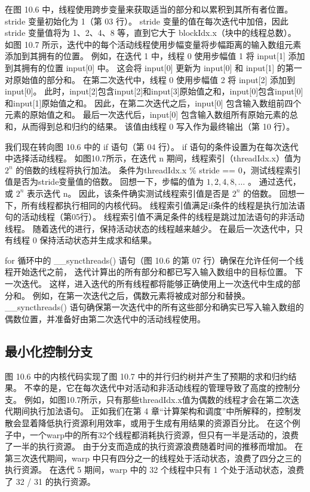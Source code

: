 在图 10.6 中，线程使用跨步变量来获取适当的部分和以累积到其所有者位置。 stride 变量初始化为 1（第 03 行）。 
stride 变量的值在每次迭代中加倍，因此 stride 变量值将为 1、2、4、8 等，直到它大于 blockIdx.x（块中的线程总数）。 
如图 10.7 所示，迭代中的每个活动线程使用步幅变量将步幅距离的输入数组元素添加到其拥有的位置。 
例如，在迭代 1 中，线程 0 使用步幅值 1 将 input[1] 添加到其拥有的位置 input[0] 中。 
这会将 input[0] 更新为 input[0] 和 input[1] 的第一对原始值的部分和。 
在第二次迭代中，线程 0 使用步幅值 2 将 input[2] 添加到 input[0]。 
此时，input[2]包含input[2]和input[3]原始值之和，input[0]包含input[0]和input[1]原始值之和。 
因此，在第二次迭代之后，input[0] 包含输入数组前四个元素的原始值之和。 
最后一次迭代后，input[0] 包含输入数组所有原始元素的总和，从而得到总和归约的结果。 
该值由线程 0 写入作为最终输出（第 10 行）。

我们现在转向图 10.6 中的 if 语句（第 04 行）。 if 语句的条件设置为在每次迭代中选择活动线程。 
如图10.7所示，在迭代 n 期间，线程索引（threadIdx.x）值为 $2^n$ 的倍数的线程将执行加法。 
条件为threadIdx.x \% stride == 0，测试线程索引值是否为stride变量值的倍数。 
回想一下，步幅的值为 $1, 2, 4, 8, \ldots$ 。 通过迭代，或 $2^n$ 表示迭代 n。 
因此，该条件确实测试线程索引值是否是 $2^n$ 的倍数。 回想一下，所有线程都执行相同的内核代码。 
线程索引值满足if条件的线程是执行加法语句的活动线程（第05行）。 线程索引值不满足条件的线程是跳过加法语句的非活动线程。 
随着迭代的进行，保持活动状态的线程越来越少。 在最后一次迭代中，只有线程 0 保持活动状态并生成求和结果。

for 循环中的 \_\_syncthreads() 语句（图 10.6 的第 07 行）确保在允许任何一个线程开始迭代之前，
迭代计算出的所有部分和都已写入输入数组中的目标位置。 下一次迭代。 
这样，进入迭代的所有线程都将能够正确使用上一次迭代中生成的部分和。 
例如，在第一次迭代之后，偶数元素将被成对部分和替换。 
\_\_syncthreads() 语句确保第一次迭代中的所有这些部分和确实已写入输入数组的偶数位置，并准备好由第二次迭代中的活动线程使用。

\subsection{最小化控制分支}
图 10.6 中的内核代码实现了图 10.7 中的并行归约树并产生了预期的求和归约结果。 
不幸的是，它在每次迭代中对活动和非活动线程的管理导致了高度的控制分支。 
例如，如图10.7所示，只有那些threadIdx.x值为偶数的线程才会在第二次迭代期间执行加法语句。 
正如我们在第 4 章“计算架构和调度”中所解释的，控制发散会显着降低执行资源利用效率，或用于生成有用结果的资源百分比。 
在这个例子中，一个warp中的所有32个线程都消耗执行资源，但只有一半是活动的，浪费了一半的执行资源。 
由于分支而造成的执行资源浪费随着时间的推移而增加。 
在第三次迭代期间，warp 中只有四分之一的线程处于活动状态，浪费了四分之三的执行资源。 
在迭代 5 期间，warp 中的 32 个线程中只有 1 个处于活动状态，浪费了 32 / 31 的执行资源。

